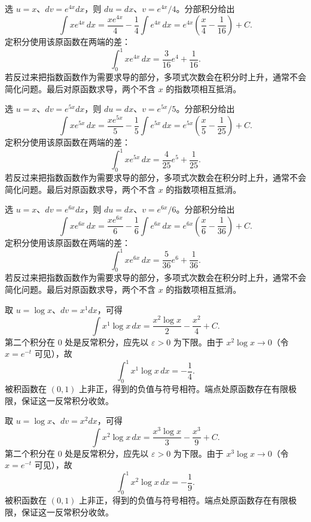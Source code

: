 \documentclass[UTF8,12pt,a4paper,fontset=fandol]{ctexart}
\begin{document}
\begin{solve}\label{ans:c13q4}
选 $u=x$、$dv=e^{4x}dx$，则 $du=dx$、$v=e^{4x}/4$。分部积分给出
\[
\int xe^{4x}\,dx=\frac{xe^{4x}}{4}-\frac1{4}\int e^{4x}\,dx=e^{4x}\left(\frac x{4}-\frac1{16}\right)+C.
\]
定积分使用该原函数在两端的差：
\[
\int_0^1xe^{4x}\,dx=\frac{3}{16}e^{4}+\frac{1}{16}.
\]
若反过来把指数函数作为需要求导的部分，多项式次数会在积分时上升，通常不会简化问题。最后对原函数求导，两个不含 $x$ 的指数项相互抵消。
\end{solve}

\begin{solve}\label{ans:c13q5}
选 $u=x$、$dv=e^{5x}dx$，则 $du=dx$、$v=e^{5x}/5$。分部积分给出
\[
\int xe^{5x}\,dx=\frac{xe^{5x}}{5}-\frac1{5}\int e^{5x}\,dx=e^{5x}\left(\frac x{5}-\frac1{25}\right)+C.
\]
定积分使用该原函数在两端的差：
\[
\int_0^1xe^{5x}\,dx=\frac{4}{25}e^{5}+\frac{1}{25}.
\]
若反过来把指数函数作为需要求导的部分，多项式次数会在积分时上升，通常不会简化问题。最后对原函数求导，两个不含 $x$ 的指数项相互抵消。
\end{solve}

\begin{solve}\label{ans:c13q6}
选 $u=x$、$dv=e^{6x}dx$，则 $du=dx$、$v=e^{6x}/6$。分部积分给出
\[
\int xe^{6x}\,dx=\frac{xe^{6x}}{6}-\frac1{6}\int e^{6x}\,dx=e^{6x}\left(\frac x{6}-\frac1{36}\right)+C.
\]
定积分使用该原函数在两端的差：
\[
\int_0^1xe^{6x}\,dx=\frac{5}{36}e^{6}+\frac{1}{36}.
\]
若反过来把指数函数作为需要求导的部分，多项式次数会在积分时上升，通常不会简化问题。最后对原函数求导，两个不含 $x$ 的指数项相互抵消。
\end{solve}

\begin{solve}\label{ans:c13q7}
取 $u=\log x$、$dv=x^{1}dx$，可得
\[
\int x^{1}\log x\,dx=\frac{x^{2}\log x}{2}-\frac{x^{2}}{4}+C.
\]
第二个积分在 $0$ 处是反常积分，应先以 $\varepsilon>0$ 为下限。由于 $x^{2}\log x\to0$（令 $x=e^{-t}$ 可见），故
\[
\int_0^1x^{1}\log x\,dx=-\frac{1}{4}.
\]
被积函数在 $(0,1)$ 上非正，得到的负值与符号相符。端点处原函数存在有限极限，保证这一反常积分收敛。
\end{solve}

\begin{solve}\label{ans:c13q8}
取 $u=\log x$、$dv=x^{2}dx$，可得
\[
\int x^{2}\log x\,dx=\frac{x^{3}\log x}{3}-\frac{x^{3}}{9}+C.
\]
第二个积分在 $0$ 处是反常积分，应先以 $\varepsilon>0$ 为下限。由于 $x^{3}\log x\to0$（令 $x=e^{-t}$ 可见），故
\[
\int_0^1x^{2}\log x\,dx=-\frac{1}{9}.
\]
被积函数在 $(0,1)$ 上非正，得到的负值与符号相符。端点处原函数存在有限极限，保证这一反常积分收敛。
\end{solve}
\end{document}

